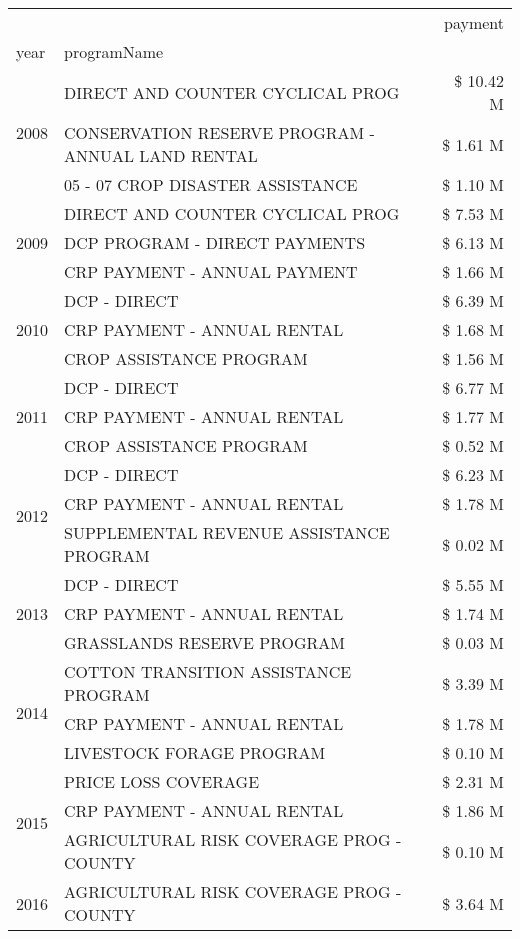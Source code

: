 \begin{tabular}{llr}
\toprule
 &  & payment \\
year & programName &  \\
\midrule
\multirow[t]{3}{*}{2008} & DIRECT AND COUNTER CYCLICAL PROG & \$ 10.42 M \\
 & CONSERVATION RESERVE PROGRAM - ANNUAL LAND RENTAL & \$ 1.61 M \\
 & 05 - 07 CROP DISASTER ASSISTANCE & \$ 1.10 M \\
\cline{1-3}
\multirow[t]{3}{*}{2009} & DIRECT AND COUNTER CYCLICAL PROG & \$ 7.53 M \\
 & DCP PROGRAM - DIRECT PAYMENTS & \$ 6.13 M \\
 & CRP PAYMENT - ANNUAL PAYMENT & \$ 1.66 M \\
\cline{1-3}
\multirow[t]{3}{*}{2010} & DCP - DIRECT & \$ 6.39 M \\
 & CRP PAYMENT - ANNUAL RENTAL & \$ 1.68 M \\
 & CROP ASSISTANCE PROGRAM & \$ 1.56 M \\
\cline{1-3}
\multirow[t]{3}{*}{2011} & DCP - DIRECT & \$ 6.77 M \\
 & CRP PAYMENT - ANNUAL RENTAL & \$ 1.77 M \\
 & CROP ASSISTANCE PROGRAM & \$ 0.52 M \\
\cline{1-3}
\multirow[t]{3}{*}{2012} & DCP - DIRECT & \$ 6.23 M \\
 & CRP PAYMENT - ANNUAL RENTAL & \$ 1.78 M \\
 & SUPPLEMENTAL REVENUE ASSISTANCE PROGRAM & \$ 0.02 M \\
\cline{1-3}
\multirow[t]{3}{*}{2013} & DCP - DIRECT & \$ 5.55 M \\
 & CRP PAYMENT - ANNUAL RENTAL & \$ 1.74 M \\
 & GRASSLANDS RESERVE PROGRAM & \$ 0.03 M \\
\cline{1-3}
\multirow[t]{3}{*}{2014} & COTTON TRANSITION ASSISTANCE PROGRAM & \$ 3.39 M \\
 & CRP PAYMENT - ANNUAL RENTAL & \$ 1.78 M \\
 & LIVESTOCK FORAGE PROGRAM & \$ 0.10 M \\
\cline{1-3}
\multirow[t]{3}{*}{2015} & PRICE LOSS COVERAGE & \$ 2.31 M \\
 & CRP PAYMENT - ANNUAL RENTAL & \$ 1.86 M \\
 & AGRICULTURAL RISK COVERAGE PROG - COUNTY & \$ 0.10 M \\
\cline{1-3}
\multirow[t]{3}{*}{2016} & AGRICULTURAL RISK COVERAGE PROG - COUNTY & \$ 3.64 M \\

\end{tabular}
